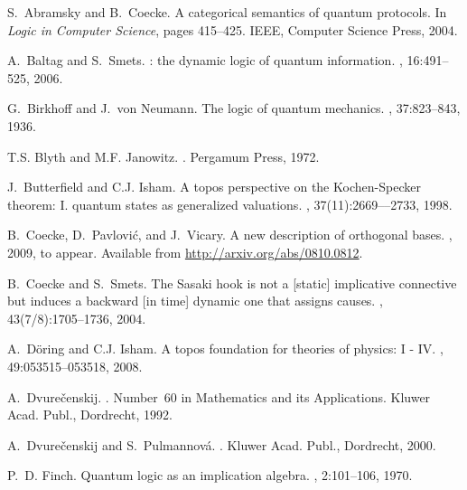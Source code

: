 \documentclass{article}
\begin{document}
\begin{thebibliography}{10}

S.~Abramsky and B.~Coecke.
\newblock A categorical semantics of quantum protocols.
\newblock In {\em Logic in Computer Science}, pages 415--425. IEEE, Computer
  Science Press, 2004.

A.~Baltag and S.~Smets.
: the dynamic logic of quantum information.
, 16:491--525, 2006.

G.~Birkhoff and J.~von Neumann.
\newblock The logic of quantum mechanics.
, 37:823--843, 1936.

T.S. Blyth and M.F. Janowitz.
.
\newblock Pergamum Press, 1972.

J.~Butterfield and C.J. Isham.
\newblock A topos perspective on the {K}ochen-{S}pecker theorem: {I}. quantum
  states as generalized valuations.
, 37(11):2669–--2733, 1998.

B.~Coecke, D.~Pavlovi{\'c}, and J.~Vicary.
\newblock A new description of orthogonal bases.
, 2009, to appear.
\newblock Available from \url{http://arxiv.org/abs/0810.0812}.

B.~Coecke and S.~Smets.
\newblock The {Sasaki} hook is not a [static] implicative connective but
  induces a backward [in time] dynamic one that assigns causes.
, 43(7/8):1705--1736, 2004.

A.~D{\"o}ring and C.J. Isham.
\newblock A topos foundation for theories of physics: {I - IV}.
, 49:053515--053518, 2008.

A.~Dvure\v{c}enskij.
.
\newblock Number~60 in Mathematics and its Applications. Kluwer Acad. Publ.,
  Dordrecht, 1992.

A.~Dvure\v{c}enskij and S.~Pulmannov{\'a}.
.
\newblock Kluwer Acad. Publ., Dordrecht, 2000.

P.~D. Finch.
\newblock Quantum logic as an implication algebra.
, 2:101--106, 1970.


\end{thebibliography}
\end{document}

